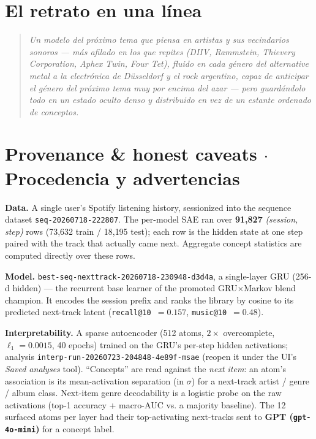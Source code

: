 \documentclass[11pt]{article}
\begin{document}
\section{El retrato en una línea}
\begin{quote}\itshape
Un modelo del próximo tema que piensa en artistas y sus vecindarios sonoros --- más
afilado en los que repites (DIIV, Rammstein, Thievery Corporation, Aphex Twin,
Four Tet), fluido en cada género del \emph{alternative metal} a la electrónica de
Düsseldorf y el rock argentino, capaz de anticipar el género del próximo tema muy
por encima del azar --- pero guardándolo todo en un estado oculto denso y
distribuido en vez de un estante ordenado de conceptos.
\end{quote}

\clearpage
\section*{Provenance \& honest caveats \quad$\cdot$\quad Procedencia y advertencias}

\textbf{Data.} A single user's Spotify listening history, sessionized into the
sequence dataset \texttt{seq-20260718-222807}. The per-model SAE ran over
\textbf{91{,}827} \emph{(session, step)} rows (73{,}632 train / 18{,}195 test);
each row is the hidden state at one step paired with the track that actually came
next. Aggregate concept statistics are computed directly over these rows.

\textbf{Model.} \texttt{best-seq-nexttrack-20260718-230948-d3d4a}, a
single-layer GRU (256-d hidden) --- the recurrent base learner of the promoted
GRU$\times$Markov blend champion. It encodes the session prefix and ranks the
library by cosine to its predicted next-track latent
(\texttt{recall@10}~$=0.157$, \texttt{music@10}~$=0.48$).

\textbf{Interpretability.} A sparse autoencoder (512 atoms, $2\times$ overcomplete,
$\ell_1=0.0015$, 40 epochs) trained on the GRU's per-step hidden activations;
analysis \texttt{interp-run-20260723-204848-4e89f-msae} (reopen it under the UI's
\emph{Saved analyses} tool). ``Concepts'' are read against the \emph{next item}:
an atom's association is its mean-activation separation (in $\sigma$) for a
next-track artist / genre / album class. Next-item genre decodability is a
logistic probe on the raw activations (top-1 accuracy + macro-AUC vs. a majority
baseline). The 12 surfaced atoms per layer had their top-activating next-tracks
sent to \textbf{GPT (\texttt{gpt-4o-mini})} for a concept label.
\end{document}
